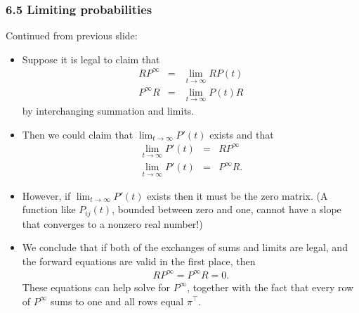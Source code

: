 \documentclass[handout]{beamer}
\def\startframe#1{\begin{frame}[t,fragile] \frametitle{\thedate \hfill {#1}} }
\begin{document}
\startframe{6.5 Limiting probabilities}
Continued from previous slide:
\begin{itemize}
\item Suppose it is legal to claim that 
\begin{eqnarray*}
RP^\infty &=& \lim_{t\to\infty}RP(t) \\
P^\infty R&=& \lim_{t\to\infty}P(t) R 
\end{eqnarray*}
by interchanging summation and limits.
\item Then we could claim that $\lim_{t\to\infty}P'(t)$ exists and that
\begin{eqnarray*}
\lim_{t\to\infty} P'(t) &=& RP^\infty \\
\lim_{t\to\infty} P'(t) &=& P^\infty R.
\end{eqnarray*}
\item However, if $\lim_{t\to\infty}P'(t)$ exists then it must be the zero matrix.
(A function like $P_{ij}(t)$, bounded between zero and one, cannot have a slope
that converges to a nonzero real number!)
\item We conclude that if both of the exchanges of sums and limits are legal, and the
forward equations are valid in the first place, then
\begin{eqnarray*}
RP^\infty = P^\infty R = 0.
\end{eqnarray*}
These equations can help solve for $P^\infty$, together with the fact
that every row of $P^\infty$ sums to one and all rows equal $\pi^\top$.
\end{itemize}




\end{frame}



\end{document}
